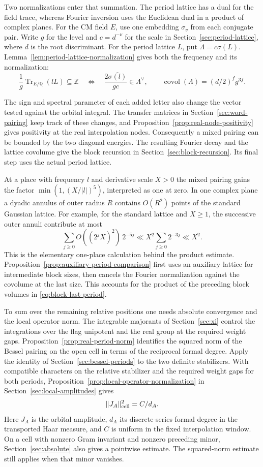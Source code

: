 Two normalizations enter that summation. The period lattice has a dual for the field trace, whereas Fourier inversion uses the Euclidean dual in a product of complex planes. For the CM field \(E\), use one embedding \(\sigma_v\) from each conjugate pair. Write \(g\) for the level and \(c=d^{-\nu}\) for the scale in Section~\ref{sec:period-lattice}, where \(d\) is the root discriminant. For the period lattice \(L\), put \(\Lambda=c\sigma(L)\). Lemma~\ref{lem:period-lattice-normalization} gives both the frequency and its normalization:
\[
 \frac1g\operatorname{Tr}_{E/\mathbb Q}(lL)\subseteq\mathbb Z
 \quad\Longleftrightarrow\quad
 \frac{2\overline{\sigma(l)}}{gc}\in\Lambda^\vee,
 \qquad \operatorname{covol}(\Lambda)=(d/2)^fg^{3f}.
\]

The sign and spectral parameter of each added letter also change the vector tested against the orbital integral. The transfer matrices in Section~\ref{sec:word-pairing} keep track of these changes, and Proposition~\ref{prop:real-node-positivity} gives positivity at the real interpolation nodes. Consequently a mixed pairing can be bounded by the two diagonal energies. The resulting Fourier decay and the lattice covolume give the block recursion in Section~\ref{sec:block-recursion}. Its final step uses the actual period lattice.

At a place with frequency \(l\) and derivative scale \(X>0\) the mixed pairing gains the factor \(\min(1,(X/|l|)^5)\), interpreted as one at zero. In one complex plane a dyadic annulus of outer radius \(R\) contains \(O(R^2)\) points of the standard Gaussian lattice. For example, for the standard lattice and \(X\ge1\), the successive outer annuli contribute at most
\[
 \sum_{j\ge0} O((2^jX)^2)\,2^{-5j}
       \ll X^2\sum_{j\ge0}2^{-3j}\ll X^2 .
\]
This is the elementary one-place calculation behind the product estimate. Proposition~\ref{prop:auxiliary-period-comparison} first uses an auxiliary lattice for intermediate block sizes, then cancels the Fourier normalization against the covolume at the last size. This accounts for the product of the preceding block volumes in \eqref{eq:block-last-period}.

To sum over the remaining relative positions one needs absolute convergence and the local operator norm. The integrable majorants of Section~\ref{sec:xi} control the integrations over the flag unipotent and the real group at the required weight gaps. Proposition~\ref{prop:real-period-norm} identifies the squared norm of the Bessel pairing on the open cell in terms of the reciprocal formal degree. Apply the identity of Section~\ref{sec:bessel-periods} to the two definite stabilizers. With compatible characters on the relative stabilizer and the required weight gaps for both periods, Proposition~\ref{prop:local-operator-normalization} in Section~\ref{sec:local-amplitudes} gives
\[
                  \|J_A\|_{\rm cell}^2=C/d_A .
\]
Here \(J_A\) is the orbital amplitude, \(d_A\) its discrete-series formal degree in the transported Haar measure, and \(C\) is uniform in the fixed interpolation window. On a cell with nonzero Gram invariant and nonzero preceding minor, Section~\ref{sec:absolute} also gives a pointwise estimate. The squared-norm estimate still applies when that minor vanishes.

